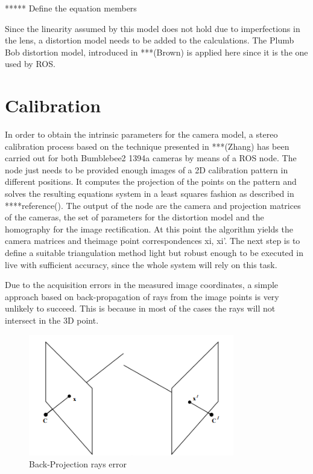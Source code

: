 ***** Define the equation members

Since the linearity assumed by this model does not hold due to imperfections in the lens, a distortion model needs to be added to the calculations. The Plumb Bob distortion model, introduced in ***(Brown) is applied here since it is the one used by ROS.

\section{Calibration}
In order to obtain the intrinsic parameters for the camera model, a stereo calibration process based on the technique presented in ***(Zhang) has been carried out for both Bumblebee2 1394a cameras by means of a ROS node. 
The node just needs to be provided enough images of a 2D calibration pattern in different positions. It computes the projection of the points on the pattern and solves the resulting equations system in a least squares fashion as described in ****reference(). The output of the node are the camera and projection matrices of the cameras, the set of parameters for the distortion model and the homography for the image rectification. 
At this point the algorithm yields the camera matrices and theimage point correspondences {xi, xi'}.
The next step is to define a suitable triangulation method light but robust enough to be executed in live with sufficient accuracy, since the whole system will rely on this task. 

Due to the acquisition errors in the measured image coordinates, a simple approach based on back-propagation of rays from the image points is very unlikely to succeed. This is because in most of the cases the rays will not intersect in the 3D point. 

\begin{figure}[h]
    \centering
    \includegraphics[width=0.8\textwidth]{figures/back_projection}
    \caption{Back-Projection rays error}
    \label{fig:Back-Projection}
\end{figure}
